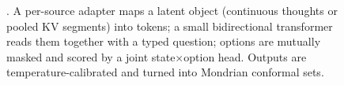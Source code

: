 \begin{figure}[t]
\centering
{}
\caption{\clr{}. A per-source adapter maps a latent object (continuous thoughts or pooled KV segments) into tokens; a small bidirectional transformer reads them together with a typed question; options are mutually masked and scored by a joint state$\times$option head. Outputs are temperature-calibrated and turned into Mondrian conformal sets.}
\label{fig:arch}
\end{figure}
